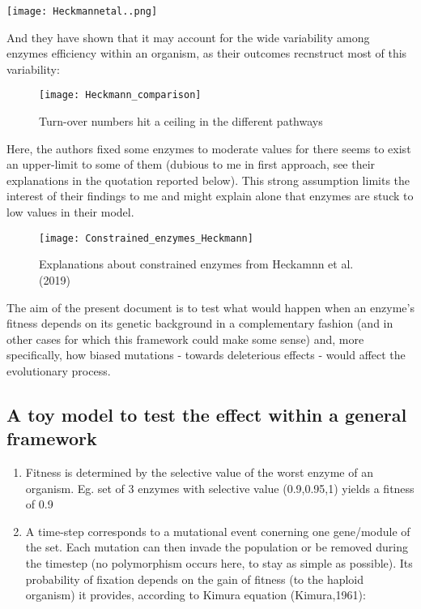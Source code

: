 \documentclass[]{article}
\begin{document}
\begin{center}\texttt{[image: Heckmannetal..png]} \end{center}

And they have shown that it may account for the wide variability among
enzymes efficiency within an organism, as their outcomes recnstruct most
of this variability:

\begin{figure}

{\centering \texttt{[image: Heckmann\_comparison]} 

}

\caption{Turn-over numbers hit a ceiling in the different pathways}\label{fig:simkcat}
\end{figure}

Here, the authors fixed some enzymes to moderate values for there seems
to exist an upper-limit to some of them (dubious to me in first
approach, see their explanations in the quotation reported below). This
strong assumption limits the interest of their findings to me and might
explain alone that enzymes are stuck to low values in their model.

\begin{figure}

{\centering \texttt{[image: Constrained\_enzymes\_Heckmann]} 

}

\caption{Explanations about constrained enzymes from Heckamnn et al.(2019)}\label{fig:constenz}
\end{figure}

The aim of the present document is to test what would happen when an
enzyme's fitness depends on its genetic background in a complementary
fashion (and in other cases for which this framework could make some
sense) and, more specifically, how biased mutations - towards
deleterious effects - would affect the evolutionary process.

\hypertarget{a-toy-model-to-test-the-effect-within-a-general-framework}{%
\subsection{A toy model to test the effect within a general
framework}\label{a-toy-model-to-test-the-effect-within-a-general-framework}}

\begin{enumerate}
\def\labelenumi{\arabic{enumi})}
\item
  Fitness is determined by the selective value of the worst enzyme of an
  organism. Eg. set of 3 enzymes with selective value (0.9,0.95,1)
  yields a fitness of 0.9
\item
  A time-step corresponds to a mutational event conerning one
  gene/module of the set. Each mutation can then invade the population
  or be removed during the timestep (no polymorphism occurs here, to
  stay as simple as possible). Its probability of fixation depends on
  the gain of fitness (to the haploid organism) it provides, according
  to Kimura equation (Kimura,1961):
\end{enumerate}
\end{document}
